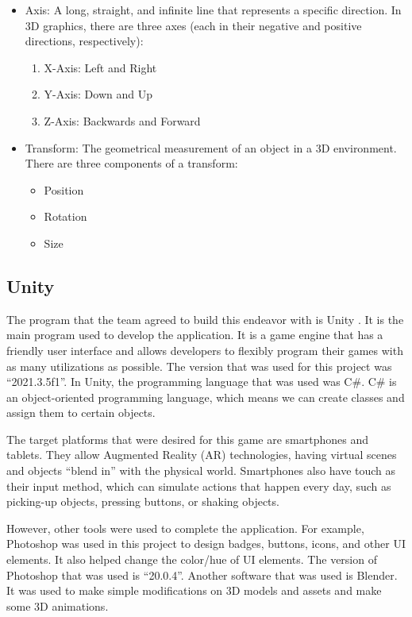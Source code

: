 \begin{itemize}
    \item{Axis: A long, straight, and infinite line that represents a specific direction. In 3D graphics, there are three axes (each in their negative and positive directions, respectively):
\begin{enumerate}
    \item{X-Axis: Left and Right}
    
    \item{Y-Axis: Down and Up}
    
    \item{Z-Axis: Backwards and Forward}

\end{enumerate}}

\item{Transform: The geometrical measurement of an object in a 3D environment. There are three components of a transform:

\begin{itemize}
    \item{Position}
    
    \item{Rotation}
    
    \item{Size}
\end{itemize}
}    
\end{itemize}

\subsection{Unity}
The program that the team agreed to build this endeavor with is Unity \cite{Unity}. It is the main program used to develop the application. It is a game engine that has a friendly user interface and allows developers to flexibly program their games with as many utilizations as possible. The version that was used for this project was “2021.3.5f1”. In Unity, the programming language that was used was C\#. C\# is an object-oriented programming language, which means we can create classes and assign them to certain objects.

The target platforms that were desired for this game are smartphones and tablets. They allow Augmented Reality (AR) technologies, having virtual scenes and objects “blend in” with the physical world. Smartphones also have touch as their input method, which can simulate actions that happen every day, such as picking-up objects, pressing buttons, or shaking objects.


However, other tools were used to complete the application. For example, Photoshop was used in this project to design badges, buttons, icons, and other UI elements. It also helped change the color/hue of UI elements. The version of Photoshop that was used is “20.0.4”. Another software that was used is Blender. It was used to make simple modifications on 3D models and assets and make some 3D animations.

